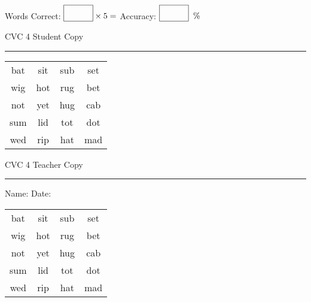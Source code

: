 \documentclass{memoir}
\begin{document}
\small

Words Correct: $\fbox{\phantom{\huge 100}} \times 5 = $ Accuracy: $\fbox{\phantom{\huge 100}}\;\; \%$ 

\vfill

\newpage


\footnotesize \noindent
CVC 4 \hfill Student Copy
\smallskip
\hrule

\Large

\setlength{\tabcolsep}{14pt}
\def\arraystretch{2}

{\selectfont


\begin{vplace}[0.5]
\begin{center}
\begin{tabular}{cccc}
bat & sit & sub & set \\
wig & hot & rug & bet \\
not & yet & hug & cab \\
sum & lid & tot & dot \\
wed & rip & hat & mad \\
\end{tabular}
\end{center}
\end{vplace}

}

\newpage

\footnotesize \noindent
CVC 4 \hfill Teacher Copy
\smallskip
\hrule

\small

\vfill

\noindent
Name: \underline{\hspace{1.75in}} \hfill Date: \underline{\hspace{1in}}

\Large

{\selectfont


\begin{vplace}[0.5]
\begin{center}
\begin{tabular}{cccc}
bat & sit & sub & set \\
wig & hot & rug & bet \\
not & yet & hug & cab \\
sum & lid & tot & dot \\
wed & rip & hat & mad \\
\end{tabular}
\end{center}
\end{vplace}



}
\end{document}
